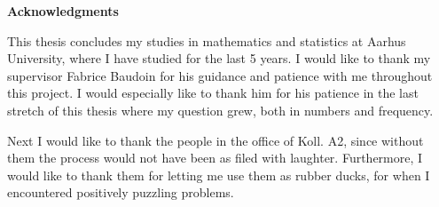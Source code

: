 




\newpage
{}

\vspace{5em}
\begin{FlushRight}
	 \Huge \textbf{Acknowledgments}
\end{FlushRight}

\vspace{3em}
This thesis concludes my studies in mathematics and statistics at Aarhus University, where I have studied for the last 5 years. I would like to thank my supervisor Fabrice Baudoin for his guidance and patience with me throughout this project. I would especially like to thank him for his patience in the last stretch of this thesis where my question grew, both in numbers and frequency.

Next I would like to thank the people in the office of Koll. A2, since without them the process would not have been as filed with laughter. Furthermore, I would like to thank them for letting me use them as rubber ducks, for when I encountered positively puzzling problems.

